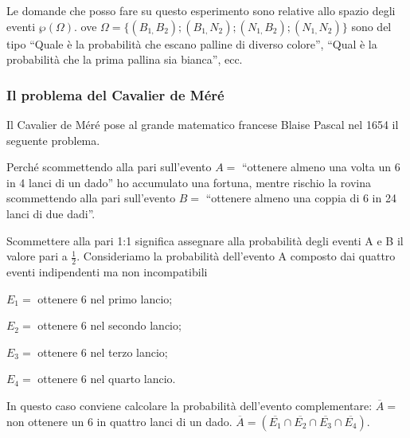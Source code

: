 \begin{esempio}
\begin{center}
\end{center}

Le domande che posso fare su questo esperimento sono relative allo spazio 
degli 
eventi \(\wp (\Omega ).\) ove \(\Omega 
=\{(B_{1,}B_2);(B_{1,}N_2);(N_{1,}B_2);(N_{1,}N_2)\}\) sono del tipo ``Quale è 
la 
probabilità che escano palline di diverso colore'', ``Qual è la probabilità 
che 
la prima pallina sia bianca'', ecc.
\end{esempio}

\subsubsection*{Il problema del Cavalier de Méré}
Il Cavalier de Méré pose al grande matematico francese Blaise Pascal nel 1654 
il 
seguente problema.
\begin{problema}
Perché scommettendo alla pari sull'evento \( A= \) ``ottenere almeno una volta 
un 
6 in 4 lanci di un dado'' ho accumulato una fortuna, mentre rischio la rovina 
scommettendo alla pari sull'evento \( B= \) ``ottenere almeno una coppia di 6 
in 
24 lanci di due dadi''.
\end{problema}
Scommettere alla pari 1:1 significa assegnare alla probabilità degli eventi A 
e 
B il valore pari a \(\frac 1 2\).
Consideriamo la probabilità dell'evento A composto dai quattro eventi 
indipendenti ma non incompatibili
\begin{itemize*}
\item \( E_1= \) ottenere 6 nel primo lancio;
\item \( E_{2}= \) ottenere 6 nel secondo lancio;
\item \( E_{3}= \) ottenere 6 nel terzo lancio;
\item \( E_{4}= \) ottenere 6 nel quarto lancio.
\end{itemize*}
In questo caso conviene calcolare la probabilità dell'evento complementare: 
\(\overline A=\) non ottenere un 6 in quattro lanci di un dado.
\(\overline A=(\overline{E_1}\cap \overline{E_2}\cap \overline{E_3}\cap 
\overline{E_4})\).

